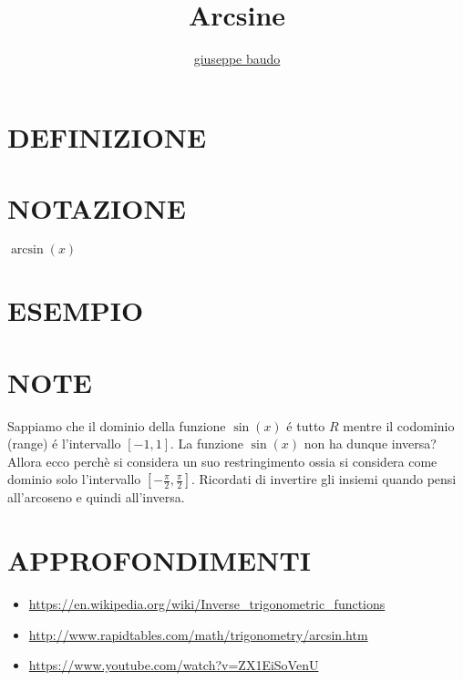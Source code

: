 \documentclass[a4paper,10pt]{article}
\title{Arcsine}
\author{\href{http://www.baudo.hol.es}{giuseppe baudo}}
\begin{document}
\maketitle

\section{DEFINIZIONE}

\section{NOTAZIONE}
$\arcsin(x)$

\section{ESEMPIO}

\section{NOTE}
Sappiamo che il dominio della funzione $\sin(x)$ \'{e} tutto $R$ mentre il codominio (range) \'{e} l'intervallo $[-1,1]$. La funzione $\sin(x)$ non ha dunque inversa?
Allora ecco perchè si considera un suo restringimento ossia si considera come dominio solo l'intervallo $[-\frac{\pi}{2},\frac{\pi}{2}]$. Ricordati di invertire gli insiemi
quando pensi all'arcoseno e quindi all'inversa.

\section{APPROFONDIMENTI}
\begin{itemize}
 \item \url{https://en.wikipedia.org/wiki/Inverse_trigonometric_functions}
 \item \url{http://www.rapidtables.com/math/trigonometry/arcsin.htm}
 \item \url{https://www.youtube.com/watch?v=ZX1EiSoVenU}
\end{itemize}
\end{document}
